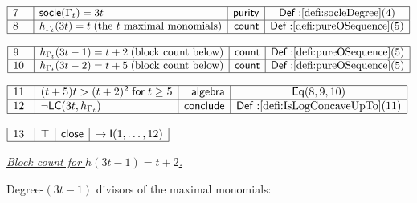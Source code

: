 \documentclass[11pt,reqno]{amsart}
\begin{document}
\nointerlineskip\noindent$%
\begin{array}{|m{0.5cm}|l|r|c|}
\hline
7 & \mathsf{socle}(\Gamma_{t})=3t & \mathsf{purity} & \mathsf{Def:}\ref%
{defi:socleDegree}(4) \\ \hline
8 & h_{\Gamma_{t}}(3t)=t\;\text{(the $t$ maximal monomials)} & \mathsf{count}
& \mathsf{Def:}\ref{defi:pureOSequence}(5) \\ \hline
\end{array}%
$

\nointerlineskip\noindent$%
\begin{array}{|m{0.5cm}|l|r|c|}
\hline
9 & h_{\Gamma_{t}}(3t-1)=t+2\;\text{(block count below)} & \mathsf{count} & 
\mathsf{Def:}\ref{defi:pureOSequence}(5) \\ \hline
10 & h_{\Gamma_{t}}(3t-2)=t+5\;\text{(block count below)} & \mathsf{count} & 
\mathsf{Def:}\ref{defi:pureOSequence}(5) \\ \hline
\end{array}%
$

\nointerlineskip\noindent$%
\begin{array}{|m{0.5cm}|l|r|c|}
\hline
11 & (t+5)t>(t+2)^{2}\;\mathsf{for}\;t\ge5 & \mathsf{algebra} & \mathsf{Eq}%
(8,9,10) \\ \hline
12 & \neg\mathsf{LC}(3t,h_{\Gamma_{t}}) & \mathsf{conclude} & \mathsf{Def:}%
\ref{defi:IsLogConcaveUpTo}(11) \\ \hline
\end{array}%
$

\nointerlineskip\noindent $%
\begin{array}{|m{0.5cm}|l|r|c|}
\hline
13 & \top  & \mathsf{close} & \rightarrow \mathsf{I}(1,\dots ,12) \\ \hline
\end{array}%
$

\medskip%

\medskip \noindent \underline{\textit{Block count for $h(3t-1)=t+2$.} }

\medskip%

\noindent%
Degree-$(3t-1)$ divisors of the maximal monomials:
\end{document}
